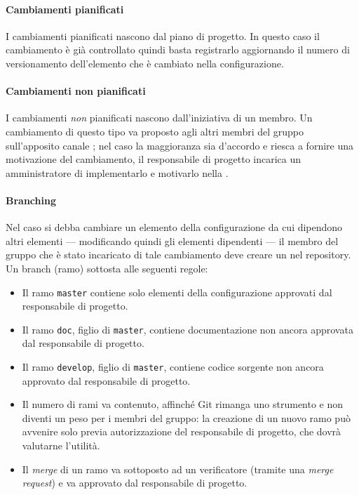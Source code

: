 			\paragraph{Cambiamenti pianificati} I cambiamenti pianificati nascono dal piano di progetto. In questo caso il cambiamento è già controllato quindi basta registrarlo aggiornando il numero di versionamento dell'elemento che è cambiato nella configurazione.
			\paragraph{Cambiamenti non pianificati} I cambiamenti \emph{non} pianificati nascono dall'iniziativa di un membro. Un cambiamento di questo tipo va proposto agli altri membri del gruppo sull'apposito canale ; nel caso la maggioranza sia d'accordo e riesca a fornire una motivazione del cambiamento, il responsabile di progetto incarica un amministratore di implementarlo e motivarlo nella .
			\paragraph{Branching} Nel caso si debba cambiare un elemento della configurazione da cui dipendono altri elementi --- modificando quindi gli elementi dipendenti --- il membro del gruppo che è stato incaricato di tale cambiamento deve creare un  nel repository. Un branch (ramo) sottosta alle seguenti regole:
			\begin{itemize}
				\item Il ramo \texttt{master} contiene solo elementi della configurazione approvati dal responsabile di progetto.
				\item Il ramo \texttt{doc}, figlio di \texttt{master}, contiene documentazione non ancora approvata dal responsabile di progetto.
				\item Il ramo \texttt{develop}, figlio di \texttt{master}, contiene codice sorgente non ancora approvato dal responsabile di progetto.
				\item Il numero di rami va contenuto, affinché Git rimanga uno strumento e non diventi un peso per i membri del gruppo: la creazione di un nuovo ramo può avvenire solo previa autorizzazione del responsabile di progetto, che dovrà valutarne l'utilità.
				\item Il \emph{merge} di un ramo va sottoposto ad un verificatore (tramite una \emph{merge request}) e va approvato dal responsabile di progetto.
			\end{itemize}
		
